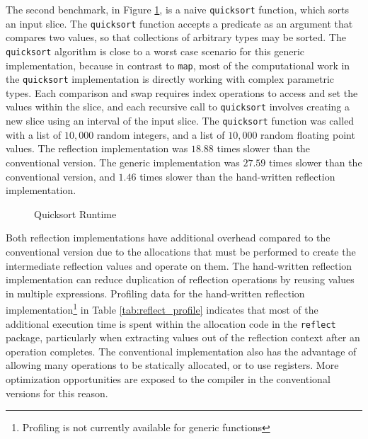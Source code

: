 \documentclass[letterpaper,11pt]{article}
\begin{document}
The second benchmark, in Figure \ref{fig:quicksort}, is a naive \texttt{quicksort} function, which sorts an input slice. The \texttt{quicksort} function accepts a predicate as an argument that compares two values, so that collections of arbitrary types may be sorted. The \texttt{quicksort} algorithm is close to a worst case scenario for this generic implementation, because in contrast to \texttt{map}, most of the computational work in the \texttt{quicksort} implementation is directly working with complex parametric types. Each comparison and swap requires index operations to access and set the values within the slice, and each recursive call to \texttt{quicksort} involves creating a new slice using an interval of the input slice. The \texttt{quicksort} function was called with a list of $10,000$ random integers, and a list of $10,000$ random floating point values. The reflection implementation was $18.88$ times slower than the conventional version. The generic implementation was $27.59$ times slower than the conventional version, and $1.46$ times slower than the hand-written reflection implementation.

\begin{figure}
    \caption{Quicksort Runtime\label{fig:quicksort}}
    \centering
    
\end{figure}

Both reflection implementations have additional overhead compared to the conventional version due to the allocations that must be performed to create the intermediate reflection values and operate on them. The hand-written reflection implementation can reduce duplication of reflection operations by reusing values in multiple expressions. Profiling data for the hand-written reflection implementation\footnote{Profiling is not currently available for generic functions} in Table \ref{tab:reflect_profile} indicates that most of the additional execution time is spent within the allocation code in the \texttt{reflect} package, particularly when extracting values out of the reflection context after an operation completes.  The conventional implementation also has the advantage of allowing many operations to be statically allocated, or to use registers. More optimization opportunities are exposed to the compiler in the conventional versions for this reason.
\end{document}
